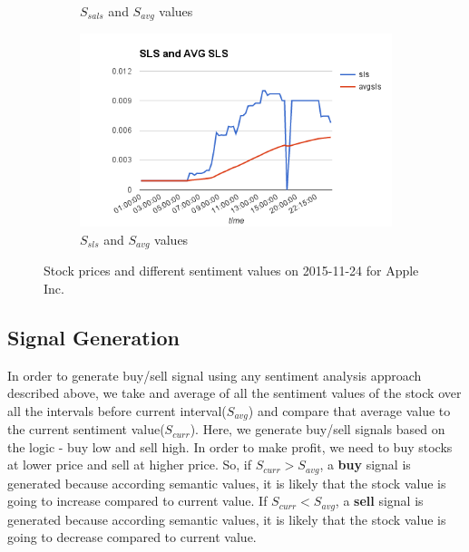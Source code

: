 \documentclass[a4paper,11pt]{article}
\begin{document}
\begin{figure}
\begin{subfigure}{.5\textwidth}
  \caption{$S_{sals}$ and $S_{avg}$ values}
  \label{fig:sfig3}
\end{subfigure}%
\begin{subfigure}{.5\textwidth}
  \centering
  \includegraphics[width=.8\linewidth]{SLS.png}
  \caption{$S_{sls}$ and $S_{avg}$ values}
  \label{fig:sfig4}
\end{subfigure}
\caption{Stock prices and different sentiment values on 2015-11-24 for Apple Inc.}
\label{fig:fig}
\end{figure}

\subsection{Signal Generation} \label{signal generation}
In order to generate buy/sell signal using any sentiment analysis approach described above, we take and average of all the sentiment values of the stock over all the intervals before current interval($S_{avg}$) and compare that average value to the current sentiment value($S_{curr}$). Here, we generate buy/sell signals based on the logic - buy low and sell high. In order to make profit, we need to buy stocks at lower price and sell at higher price. So, if $S_{curr} > S_{avg}$, a \textbf{buy} signal is generated because according semantic values, it is likely that the stock value is going to increase compared to current value. If $S_{curr} < S_{avg}$, a \textbf{sell} signal is generated because according semantic values, it is likely that the stock value is going to decrease compared to current value.
\end{document}
